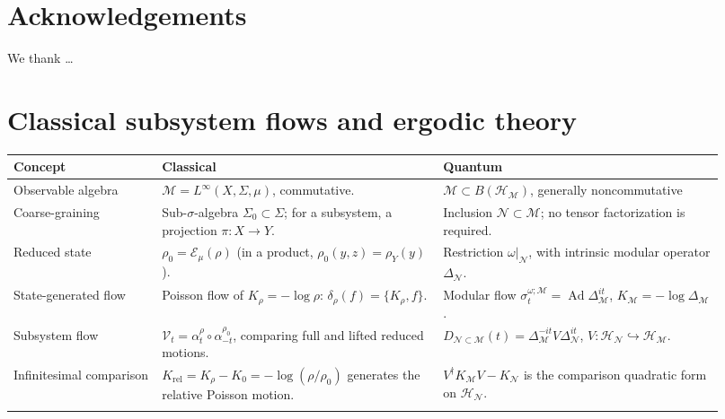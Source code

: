 \documentclass[a4paper,11pt]{article}
\theoremstyle{definition}
\newcommand{\mN}{\mathcal{N}}
\newcommand{\mH}{\mathcal{H}}
\newcommand{\mM}{\mathcal{M}}
\newcommand{\mE}{\mathcal{E}}
\begin{document}
\section*{Acknowledgements}
We thank \ldots

\appendix



\section{Classical subsystem flows and ergodic theory}\label{sec:classical}

\begin{table}[htbp]
\centering
\label{tab:classical-quantum-dictionary}
\begingroup
\footnotesize
\setlength{\tabcolsep}{4pt}
\renewcommand{\arraystretch}{1.22}
\begin{tabular}{@{}>{\raggedright\arraybackslash}p{0.19\linewidth}
                >{\raggedright\arraybackslash}p{0.365\linewidth}
                >{\raggedright\arraybackslash}p{0.365\linewidth}@{}}
\toprule
\textbf{Concept} & \textbf{Classical} & \textbf{Quantum} \\
\midrule
Observable algebra &
$\mM=L^\infty(X,\Sigma,\mu)$, commutative. &
$\mM\subset B(\mH_{\mM})$, generally noncommutative \\
\addlinespace[2pt]
Coarse-graining &
Sub-$\sigma$-algebra $\Sigma_0\subset\Sigma$; for a subsystem, a projection $\pi:X\to Y$. &
Inclusion $\mN\subset\mM$; no tensor factorization is required. \\
\addlinespace[2pt]
Reduced state &
$\rho_0=\mE_\mu(\rho)$ (in a product, $\rho_0(y,z)=\rho_Y(y)$). &
Restriction $\omega|_{\mN}$, with intrinsic modular operator $\Delta_{\mN}$. \\
\addlinespace[2pt]
State-generated flow &
Poisson flow of $K_\rho=-\log\rho$:
$\delta_\rho(f)=\{K_\rho,f\}$. &
Modular flow $\sigma_t^{\omega;\mM}=\operatorname{Ad}\Delta_{\mM}^{it}$,
$K_{\mM}=-\log\Delta_{\mM}$. \\
\addlinespace[2pt]
Subsystem flow &
$\mathcal V_t=\alpha_t^\rho\circ\alpha_{-t}^{\rho_0}$,
comparing full and lifted reduced motions. &
$D_{\mN\subset\mM}(t)=\Delta_{\mM}^{-it}V\Delta_{\mN}^{it}$,
$V:\mH_{\mN}\hookrightarrow\mH_{\mM}$. \\
\addlinespace[2pt]
Infinitesimal comparison &
$K_{\mathrm{rel}}=K_\rho-K_0
=-\log(\rho/\rho_0)$ generates the relative Poisson motion. &
$V^\dagger K_{\mM}V-K_{\mN}$ is the comparison quadratic form on $\mH_{\mN}$. \\
\addlinespace[2pt]

\end{tabular}
\end{table}
\end{document}
